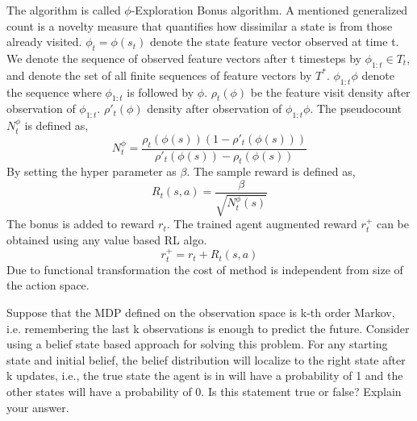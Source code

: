 \documentclass[solution,addpoints,12pt]{exam}
\begin{document}
\begin{questions}
\begin{solution}
The algorithm is called $\phi$-Exploration Bonus algorithm. A mentioned generalized count is a novelty measure that quantifies how dissimilar a state is from those already visited. $\phi_t = \phi(s_t)$ denote the state feature vector observed at time t. We denote the sequence of observed feature vectors after t timesteps by $\phi_{1:t}\in T_t$, and denote the set of all finite sequences of feature vectors by $T^*$. $\phi_{1:t}\phi$ denote the sequence where $\phi_{1:t}$ is followed by $\phi$. 
$\rho_t(\phi)$ be the feature visit density after observation of $\phi_{1:t}$. $\rho'_t(\phi)$ density after observation of $\phi_{1:t}\phi$. The pseudocount $N_t^\phi$ is defined as,
\begin{equation}
	N^\phi_t = \frac{\rho_t(\phi(s))(1-\rho'_t(\phi(s)))}{\rho'_t(\phi(s))-\rho_t(\phi(s))}
\end{equation}
By setting the hyper parameter as $\beta$.  The sample reward is defined as,
\begin{equation}
R_t(s,a) = \frac{\beta}{\sqrt{N^\phi_t(s)}}
\end{equation} 
The bonus is added to reward $r_t$. The trained agent augmented reward $r^+_t$ can be obtained using any value based RL algo.
\begin{equation}
r^+_t = r_t + R_t(s,a)
\end{equation}  Due to functional transformation the cost of method is independent from size of the action space.
\end{solution}
\question[5] Suppose that the MDP defined on the observation space is k-th order Markov, i.e. remembering the last k observations is enough to predict the future. 
Consider using a belief state based approach for solving this problem. For any starting state and initial belief, the belief distribution will localize to the right state after k updates, i.e., the true state the agent is in will have a probability of 1 and the other states will have a probability of 0. Is this statement true or false? Explain your answer. 


\end{questions}
\end{document}

